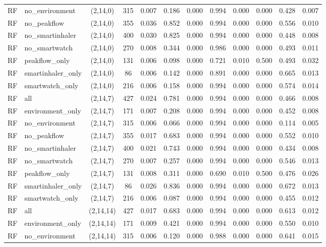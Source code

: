 \begin{longtable}{llcccccccccc}
RF & no\_environment & (2,14,0) & 315 & 0.007 & 0.186 & 0.000 & 0.994 & 0.000 & 0.000 & 0.428 & 0.007 \\
RF & no\_peakflow & (2,14,0) & 355 & 0.036 & 0.852 & 0.000 & 0.994 & 0.000 & 0.000 & 0.556 & 0.010 \\
RF & no\_smartinhaler & (2,14,0) & 400 & 0.030 & 0.825 & 0.000 & 0.994 & 0.000 & 0.000 & 0.448 & 0.008 \\
RF & no\_smartwatch & (2,14,0) & 270 & 0.008 & 0.344 & 0.000 & 0.986 & 0.000 & 0.000 & 0.493 & 0.011 \\
RF & peakflow\_only & (2,14,0) & 131 & 0.006 & 0.098 & 0.000 & 0.721 & 0.010 & 0.500 & 0.493 & 0.032 \\
RF & smartinhaler\_only & (2,14,0) & 86 & 0.006 & 0.142 & 0.000 & 0.891 & 0.000 & 0.000 & 0.665 & 0.013 \\
RF & smartwatch\_only & (2,14,0) & 216 & 0.006 & 0.158 & 0.000 & 0.994 & 0.000 & 0.000 & 0.574 & 0.014 \\
RF & all & (2,14,7) & 427 & 0.024 & 0.781 & 0.000 & 0.994 & 0.000 & 0.000 & 0.466 & 0.008 \\
RF & environment\_only & (2,14,7) & 171 & 0.007 & 0.208 & 0.000 & 0.994 & 0.000 & 0.000 & 0.452 & 0.008 \\
RF & no\_environment & (2,14,7) & 315 & 0.006 & 0.066 & 0.000 & 0.994 & 0.000 & 0.000 & 0.114 & 0.005 \\
RF & no\_peakflow & (2,14,7) & 355 & 0.017 & 0.683 & 0.000 & 0.994 & 0.000 & 0.000 & 0.552 & 0.010 \\
RF & no\_smartinhaler & (2,14,7) & 400 & 0.021 & 0.743 & 0.000 & 0.994 & 0.000 & 0.000 & 0.434 & 0.008 \\
RF & no\_smartwatch & (2,14,7) & 270 & 0.007 & 0.257 & 0.000 & 0.994 & 0.000 & 0.000 & 0.546 & 0.013 \\
RF & peakflow\_only & (2,14,7) & 131 & 0.008 & 0.311 & 0.000 & 0.690 & 0.010 & 0.500 & 0.476 & 0.026 \\
RF & smartinhaler\_only & (2,14,7) & 86 & 0.026 & 0.836 & 0.000 & 0.994 & 0.000 & 0.000 & 0.672 & 0.013 \\
RF & smartwatch\_only & (2,14,7) & 216 & 0.006 & 0.087 & 0.000 & 0.994 & 0.000 & 0.000 & 0.455 & 0.012 \\
RF & all & (2,14,14) & 427 & 0.017 & 0.683 & 0.000 & 0.994 & 0.000 & 0.000 & 0.613 & 0.012 \\
RF & environment\_only & (2,14,14) & 171 & 0.009 & 0.421 & 0.000 & 0.994 & 0.000 & 0.000 & 0.550 & 0.010 \\
RF & no\_environment & (2,14,14) & 315 & 0.006 & 0.120 & 0.000 & 0.988 & 0.000 & 0.000 & 0.641 & 0.015 \\

\end{longtable}
